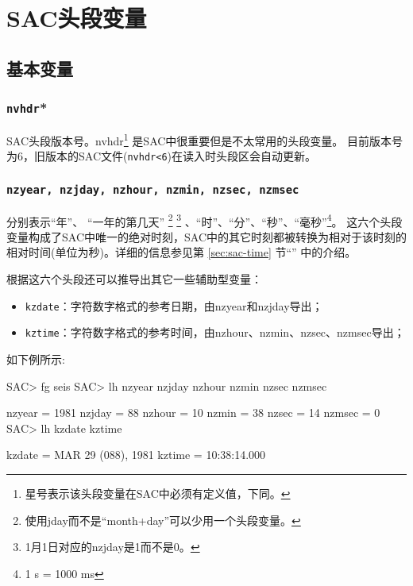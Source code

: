 \section{SAC头段变量}
\label{sec:sac-header-variables}

\subsection{基本变量}

\subsubsection{\texttt{nvhdr}*}
SAC头段版本号。nvhdr\footnote{星号表示该头段变量在SAC中必须有定义值，下同。}
是SAC中很重要但是不太常用的头段变量。
目前版本号为6，旧版本的SAC文件(\texttt{nvhdr<6})在读入时头段区会自动更新。

\subsubsection{\texttt{nzyear, nzjday, nzhour, nzmin, nzsec, nzmsec}}
分别表示``年''、
``一年的第几天''
\footnote{使用jday而不是``month+day''可以少用一个头段变量。}
\footnote{1月1日对应的nzjday是1而不是0。}
、``时''、``分''、``秒''、``毫秒''\footnote{1 s = 1000 ms}。
这六个头段变量构成了SAC中唯一的绝对时刻，SAC中的其它时刻都被转换为相对于该时刻的
相对时间(单位为秒)。详细的信息参见第 \ref{sec:sac-time} 节``''
中的介绍。

根据这六个头段还可以推导出其它一些辅助型变量：
\begin{itemize}
\item \texttt{kzdate}：字符数字格式的参考日期，由nzyear和nzjday导出；
\item \texttt{kztime}：字符数字格式的参考时间，由nzhour、nzmin、nzsec、nzmsec导出；
\end{itemize}

如下例所示:
\begin{SACCode}
SAC> fg seis
SAC> lh nzyear nzjday nzhour nzmin nzsec nzmsec

     nzyear = 1981
     nzjday = 88
     nzhour = 10
      nzmin = 38
      nzsec = 14
     nzmsec = 0
SAC> lh kzdate kztime

     kzdate = MAR 29 (088), 1981
     kztime = 10:38:14.000
\end{SACCode}

